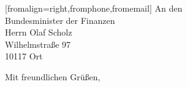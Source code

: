 \documentclass[ version=last,
                backaddress=on,
                12pt,
                a4paper,
                firstfoot=false,
                fromrule=false,
                fromlogo=false,
                enlargefirstpage=true]{scrlttr2}
\begin{document}
\begin{letter}[fromalign=right,fromphone,fromemail]{
An den\\
Bundesminister der Finanzen\\
Herrn Olaf Scholz\\
Wilhelmstraße 97\\
10117 Ort
}
\closing{Mit freundlichen Grüßen,}

\end{letter}
\end{document}
